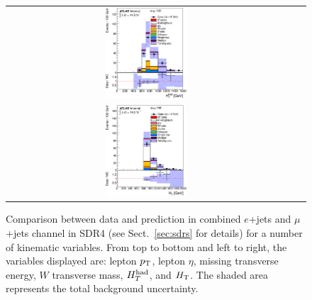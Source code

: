 \begin{figure}[h!]
\begin{center}
\begin{tabular}{ccc}
\includegraphics[width=0.30\textwidth]{appendices/figures/sdrs/HTHad_ELEMUONCR3_1W_NOMINAL.eps}  \\
\includegraphics[width=0.30\textwidth]{appendices/figures/sdrs/HTAll_ELEMUONCR3_1W_NOMINAL.eps}  &  &\\
\end{tabular}\caption{\small {Comparison between data and prediction in combined $e$+jets and $\mu$+jets channel in SDR4 (see Sect.~\ref{sec:sdrs} for details) 
for a number of kinematic variables. From top to bottom and left to right, the variables displayed are: lepton $\pt$, lepton $\eta$, missing transverse energy, $W$ transverse mass,
$\hthad$, and $\HT$. The shaded area represents the total background uncertainty.}}
\label{fig:ELEMUONCR3_1}
\end{center}
\end{figure}                                                                             


